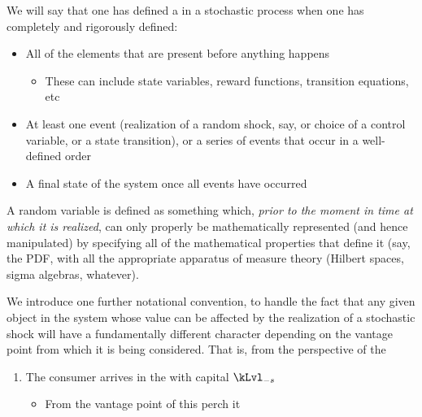 \documentclass[\econtexRoot/BufferStockTheory]{subfiles}
\begin{document}
We will say that one has defined a {\stge} in a stochastic process when one has completely and rigorously defined:
\begin{itemize}
\item All of the elements that are present before anything happens
  \begin{itemize}
  \item These can include state variables, reward functions, transition equations, etc
  \end{itemize}
\item At least one event (realization of a random shock, say, or choice of a control variable, or a state transition), or a series of events that occur in a well-defined order
  \item A final state of the system once all events have occurred
\end{itemize}

A random variable is defined as something which, \textit{prior to the moment in time at which it is realized}, can only properly be mathematically represented (and hence manipulated) by specifying all of the mathematical properties that define it  (say, the PDF, with all the appropriate apparatus of measure theory (Hilbert spaces, sigma algebras, whatever).


We introduce one further notational convention, to handle the fact that any given object in the system whose value can be affected by the realization of a stochastic shock will have a fundamentally different character depending on the vantage point from which it is being considered.
That is, from the perspective of the 

\begin{enumerate}
\item The consumer arrives in the {\stge} with capital $\kLvl_{-\tnow}$
  \begin{itemize}
    \item From the vantage point of this perch it 
    \end{itemize}
  \end{enumerate}
\end{document}
